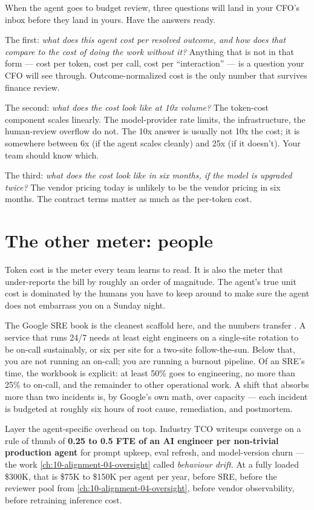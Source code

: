 When the agent goes to budget review, three questions will land in your CFO's inbox before they land in yours. Have the answers ready.

The first: \textit{what does this agent cost per resolved outcome, and how does that compare to the cost of doing the work without it?} Anything that is not in that form --- cost per token, cost per call, cost per ``interaction'' --- is a question your CFO will see through. Outcome-normalized cost is the only number that survives finance review.

The second: \textit{what does the cost look like at 10x volume?} The token-cost component scales linearly. The model-provider rate limits, the infrastructure, the human-review overflow do not. The 10x answer is usually not 10x the cost; it is somewhere between 6x (if the agent scales cleanly) and 25x (if it doesn't). Your team should know which.

The third: \textit{what does the cost look like in six months, if the model is upgraded twice?} The vendor pricing today is unlikely to be the vendor pricing in six months. The contract terms matter as much as the per-token cost.

\section{The other meter: people}

Token cost is the meter every team learns to read. It is also the meter that under-reports the bill by roughly an order of magnitude. The agent's true unit cost is dominated by the humans you have to keep around to make sure the agent does not embarrass you on a Sunday night.

The Google SRE book is the cleanest scaffold here, and the numbers transfer \citep{google-sre-book}. A service that runs 24/7 needs at least eight engineers on a single-site rotation to be on-call sustainably, or six per site for a two-site follow-the-sun. Below that, you are not running an on-call; you are running a burnout pipeline. Of an SRE's time, the workbook is explicit: at least 50\% goes to engineering, no more than 25\% to on-call, and the remainder to other operational work. A shift that absorbs more than two incidents is, by Google's own math, over capacity --- each incident is budgeted at roughly six hours of root cause, remediation, and postmortem.

Layer the agent-specific overhead on top. Industry TCO writeups converge on a rule of thumb of \textbf{0.25 to 0.5 FTE of an AI engineer per non-trivial production agent} for prompt upkeep, eval refresh, and model-version churn --- the work \autoref{ch:10-alignment-04-oversight} called \textit{behaviour drift}. At a fully loaded \$300K, that is \$75K to \$150K per agent per year, before SRE, before the reviewer pool from \autoref{ch:10-alignment-04-oversight}, before vendor observability, before retraining inference cost.

